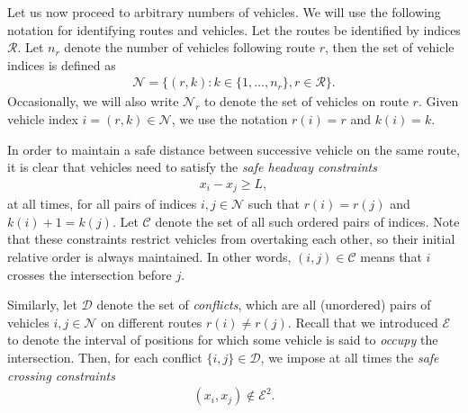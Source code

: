 \documentclass[a4paper]{report}
\theoremstyle{definition}
\theoremstyle{plain}
\begin{document}
Let us now proceed to arbitrary numbers of vehicles. We will use the following
notation for identifying routes and vehicles.
%
Let the routes be identified by indices $\mathcal{R}$. Let $n_{r}$ denote the
number of vehicles following route $r$, then the set of vehicle indices is
defined as
\begin{align}
  \mathcal{N} = \{ (r, k) : k \in \{1, \dots, n_{r}\}, r \in \mathcal{R}\} .
\end{align}
Occasionally, we will also write $\mathcal{N}_{r}$ to denote the set of vehicles
on route $r$. Given vehicle index $i = (r, k) \in \mathcal{N}$, we use the
notation $r(i) = r$ and $k(i) = k$.

In order to maintain a safe distance between successive vehicle on the same
route, it is clear that vehicles need to satisfy the \textit{safe headway constraints}
\begin{align}
  \label{eq:follow_constraints}
  x_{i} - x_{j} \geq L ,
\end{align}
at all times, for all pairs of indices $i, j \in \mathcal{N}$ such that
$r(i) = r(j)$ and $k(i) + 1 = k(j)$. Let $\mathcal{C}$ denote the set of all
such ordered pairs of indices. Note that these constraints restrict vehicles
from overtaking each other, so their initial relative order is always
maintained. In other words, $(i,j) \in \mathcal{C}$ means that $i$ crosses the
intersection before $j$.

Similarly, let $\mathcal{D}$ denote the set of \emph{conflicts}, which are all
(unordered) pairs of vehicles $i, j \in \mathcal{N}$ on different routes
$r(i) \neq r(j)$.
%
Recall that we introduced $\mathcal{E}$ to denote the interval of positions for
which some vehicle is said to \emph{occupy} the intersection. Then, for each conflict
$\{i,j\} \in \mathcal{D}$, we impose at all times the \emph{safe crossing constraints}
\begin{align}
  \label{eq:2}
  (x_{i}, x_{j}) \notin \mathcal{E}^{2} .
\end{align}
\end{document}
